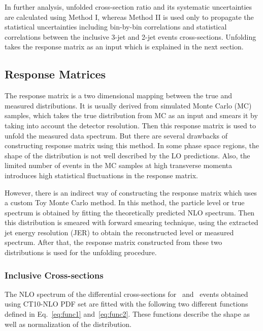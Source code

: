 In further analysis, unfolded cross-section ratio \ratio and its systematic uncertainties are calculated using Method I, whereas Method II is used only to propagate the statistical uncertainties including bin-by-bin correlations and statistical correlations between the inclusive 3-jet and 2-jet events cross-sections. Unfolding takes the response matrix as an input which is explained in the next section.

\subsection{Response Matrices}
\label{sec:funcs}
The response matrix is a two dimensional mapping between the true and measured distributions. It is usually derived from simulated Monte Carlo (MC) samples, which takes the true distribution from MC as an input and smears it by taking into account the detector resolution. Then this response matrix is used to unfold the measured data spectrum. But there are several drawbacks of constructing response matrix using this method. In some phase space regions, the shape of the distribution is not well described by the LO predictions. Also, the limited number of events in the MC samples at high transverse momenta introduces high statistical fluctuations in the response matrix. 

However, there is an indirect way of constructing the response matrix which uses a custom Toy Monte Carlo method. In this method, the particle level or true \httwo spectrum is obtained by fitting the theoretically predicted NLO spectrum. Then this distribution is smeared with forward smearing technique, using the extracted jet energy resolution (JER) to obtain the reconstructed level or measured \httwo spectrum. After that, the response matrix constructed from these two distributions is used for the unfolding procedure. 

\subsubsection{Inclusive Cross-sections}
\label{sec:cross_sec_res}
The NLO spectrum of the differential cross-sections for \njt~and \njth~events obtained using CT10-NLO PDF set are fitted with the following two different functions defined in Eq.~\ref{eq:func1} and~\ref{eq:func2}. These functions describe the shape as well as normalization of the distribution.

